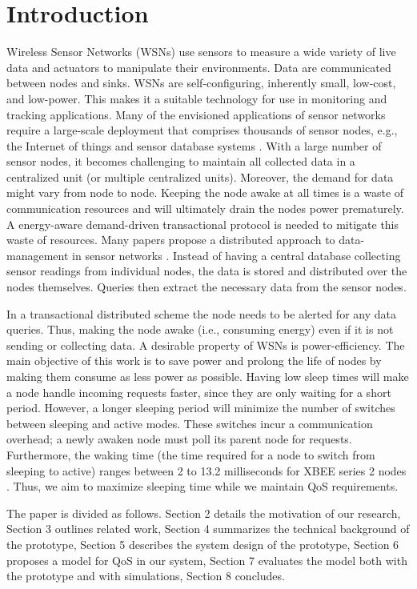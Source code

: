 \section{Introduction}\label{sec:Intro}

Wireless Sensor Networks (WSNs) use sensors to measure a wide variety of live data and actuators to manipulate their environments. Data are communicated between nodes and sinks. WSNs are self-configuring, inherently small, low-cost, and low-power. This makes it a suitable technology for use in monitoring and tracking applications. Many of the envisioned applications of sensor networks require a large-scale deployment that comprises thousands of sensor nodes, e.g., the Internet of things \cite{22} and sensor database systems \cite{2}. With a large number of sensor nodes, it becomes challenging to maintain all collected data in a centralized unit (or multiple centralized units). Moreover, the demand for data might vary from node to node. Keeping the node awake at all times is a waste of communication resources and will ultimately drain the nodes power prematurely. A energy-aware demand-driven transactional protocol is needed to mitigate this waste of resources. Many papers propose a distributed approach to data-management in sensor networks \cite{2,4.11,23}. Instead of having a central database collecting sensor readings from individual nodes, the data is stored and distributed over the nodes themselves. Queries then extract the necessary data from the sensor nodes. 

In a transactional distributed scheme the node needs to be alerted for any data queries. Thus, making the node awake (i.e., consuming energy) even if it is not sending or collecting data. A desirable property of WSNs is power-efficiency. The main objective of this work is to save power and prolong the life of nodes by making them consume as less power as possible. Having low sleep times will make a node handle incoming requests faster, since they are only waiting for a short period. However, a longer sleeping period will minimize the number of switches between sleeping and active modes. These switches incur a communication overhead; a newly awaken node must poll its parent node for requests. Furthermore, the waking time (the time required for a node to switch from sleeping to active) ranges between 2 to 13.2 milliseconds for XBEE series 2 nodes \cite{19}. Thus, we aim to maximize sleeping time while we maintain QoS requirements.

The paper is divided as follows. Section 2 details the motivation of our research, Section 3 outlines related work, Section 4 summarizes the technical background of the prototype, Section 5 describes the system design of the prototype, Section 6 proposes a model for QoS in our system, Section 7 evaluates the model both with the prototype and with simulations, Section 8 concludes.